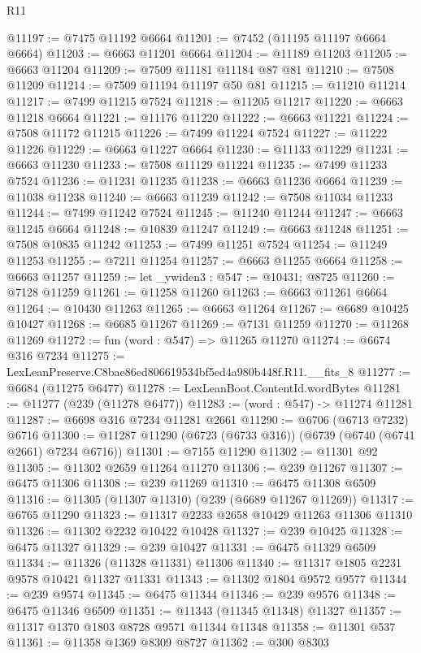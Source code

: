 \begin{lexlean}{R11}
\begin{coremodule}
@11197 := @7475 @11192 @6664
@11201 := @7452 (@11195 @11197 @6664 @6664)
@11203 := @6663 @11201 @6664
@11204 := @11189 @11203
@11205 := @6663 @11204
@11209 := @7509 @11181 @11184 @87 @81
@11210 := @7508 @11209
@11214 := @7509 @11194 @11197 @50 @81
@11215 := @11210 @11214
@11217 := @7499 @11215 @7524
@11218 := @11205 @11217
@11220 := @6663 @11218 @6664
@11221 := @11176 @11220
@11222 := @6663 @11221
@11224 := @7508 @11172 @11215
@11226 := @7499 @11224 @7524
@11227 := @11222 @11226
@11229 := @6663 @11227 @6664
@11230 := @11133 @11229
@11231 := @6663 @11230
@11233 := @7508 @11129 @11224
@11235 := @7499 @11233 @7524
@11236 := @11231 @11235
@11238 := @6663 @11236 @6664
@11239 := @11038 @11238
@11240 := @6663 @11239
@11242 := @7508 @11034 @11233
@11244 := @7499 @11242 @7524
@11245 := @11240 @11244
@11247 := @6663 @11245 @6664
@11248 := @10839 @11247
@11249 := @6663 @11248
@11251 := @7508 @10835 @11242
@11253 := @7499 @11251 @7524
@11254 := @11249 @11253
@11255 := @7211 @11254
@11257 := @6663 @11255 @6664
@11258 := @6663 @11257
@11259 := let _ywiden3 : @547 := @10431; @8725
@11260 := @7128 @11259
@11261 := @11258 @11260
@11263 := @6663 @11261 @6664
@11264 := @10430 @11263
@11265 := @6663 @11264
@11267 := @6689 @10425 @10427
@11268 := @6685 @11267
@11269 := @7131 @11259
@11270 := @11268 @11269
@11272 := fun (word : @547) => @11265 @11270
@11274 := @6674 @316 @7234
@11275 := LexLeanPreserve.C8bae86ed806619534bf5ed4a980b448f.R11.__fits_8
@11277 := @6684 (@11275 @6477)
@11278 := LexLeanBoot.ContentId.wordBytes
@11281 := @11277 (@239 (@11278 @6477))
@11283 := (word : @547) -> @11274 @11281
@11287 := @6698 @316 @7234 @11281 @2661
@11290 := @6706 (@6713 @7232) @6716
@11300 := @11287 @11290 (@6723 (@6733 @316)) (@6739 (@6740 (@6741 @2661) @7234 @6716))
@11301 := @7155 @11290
@11302 := @11301 @92
@11305 := @11302 @2659 @11264 @11270
@11306 := @239 @11267
@11307 := @6475 @11306
@11308 := @239 @11269
@11310 := @6475 @11308 @6509
@11316 := @11305 (@11307 @11310) (@239 (@6689 @11267 @11269))
@11317 := @6765 @11290
@11323 := @11317 @2233 @2658 @10429 @11263 @11306 @11310
@11326 := @11302 @2232 @10422 @10428
@11327 := @239 @10425
@11328 := @6475 @11327
@11329 := @239 @10427
@11331 := @6475 @11329 @6509
@11334 := @11326 (@11328 @11331) @11306
@11340 := @11317 @1805 @2231 @9578 @10421 @11327 @11331
@11343 := @11302 @1804 @9572 @9577
@11344 := @239 @9574
@11345 := @6475 @11344
@11346 := @239 @9576
@11348 := @6475 @11346 @6509
@11351 := @11343 (@11345 @11348) @11327
@11357 := @11317 @1370 @1803 @8728 @9571 @11344 @11348
@11358 := @11301 @537
@11361 := @11358 @1369 @8309 @8727
@11362 := @300 @8303

\end{coremodule}
\end{lexlean}
